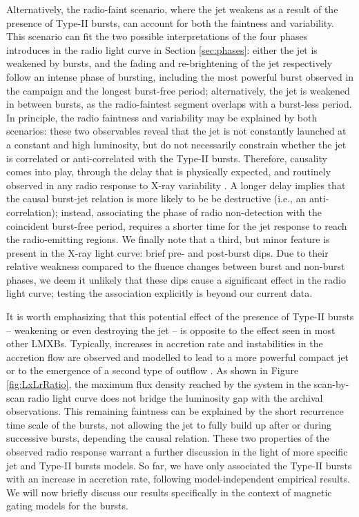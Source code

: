 \documentclass[fleqn,usenatbib]{mnras}
\begin{document}
Alternatively, the radio-faint scenario, where the jet weakens as a result of the presence of Type-II bursts, can account for both the faintness and variability. This scenario can fit the two possible interpretations of the four phases introduces in the radio light curve in Section \ref{sec:phases}: either the jet is weakened by bursts, and the fading and re-brightening of the jet respectively follow an intense phase of bursting, including the most powerful burst observed in the campaign and the longest burst-free period; alternatively, the jet is weakened in between bursts, as the radio-faintest segment overlaps with a burst-less period. In principle, the radio faintness and variability may be explained by both scenarios: these two observables reveal that the jet is not constantly launched at a constant and high luminosity, but do not necessarily constrain whether the jet is correlated or anti-correlated with the Type-II bursts. Therefore, causality comes into play, through the delay that is physically expected, and routinely observed in any radio response to X-ray variability \citep{atetarenko2019_cygx1,vincentelli2023,russell2024}. A longer delay implies that the causal burst-jet relation is more likely to be be destructive (i.e., an anti-correlation); instead, associating the phase of radio non-detection with the coincident burst-free period, requires a shorter time for the jet response to reach the radio-emitting regions. We finally note that a third, but minor feature is present in the X-ray light curve: brief pre- and post-burst dips. Due to their relative weakness compared to the fluence changes between burst and non-burst phases, we deem it unlikely that these dips cause a significant effect in the radio light curve; testing the association explicitly is beyond our current data.

It is worth emphasizing that this potential effect of the presence of Type-II bursts -- weakening or even destroying the jet -- is opposite to the effect seen in most other LMXBs. Typically, increases in accretion rate and instabilities in the accretion flow are observed and modelled to lead to a more powerful compact jet or to the emergence of a second type of outflow \citep[transient ejecta, for instance, or expanding plasmoids suggested in tMSPs;][]{papitto2022}. As shown in Figure \ref{fig:LxLrRatio}, the maximum flux density reached by the system in the scan-by-scan radio light curve does not bridge the luminosity gap with the archival observations. This remaining faintness can be explained by the short recurrence time scale of the bursts, not allowing the jet to fully build up after or during successive bursts, depending the causal relation. These two properties of the observed radio response warrant a further discussion in the light of more specific jet and Type-II bursts models. So far, we have only associated the Type-II bursts with an increase in accretion rate, following model-independent empirical results. We will now briefly discuss our results specifically in the context of magnetic gating models for the bursts.
\end{document}
